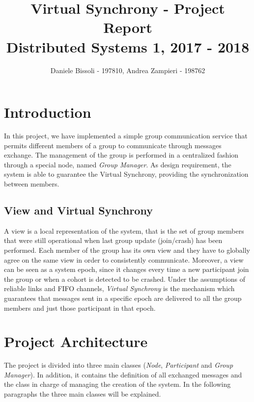 \documentclass[11pt]{article}
\title{\LARGE{\textbf{Virtual Synchrony - Project Report}\\[0mm]\large{Distributed Systems 1, 2017 - 2018}}}
\author{Daniele Bissoli - 197810, Andrea Zampieri - 198762}
\date{}
\begin{document}
	\maketitle
	
	\section{Introduction}
	In this project, we have implemented a simple group communication service that permits different members of a group to communicate through messages exchange. The management of the group is performed in a centralized fashion through a special node, named \textit{Group Manager}. As design requirement, the system is able to guarantee the Virtual Synchrony, providing the synchronization between members.
	
	\subsection{View and Virtual Synchrony}
	A view is a local representation of the system, that is the set of group members that were still operational when last group update (join/crash) has been performed. Each member of the group has its own view and they have to globally agree on the same view in order to consistently communicate. Moreover, a view can be seen as a system epoch, since it changes every time a new participant join the group or when a cohort is detected to be crashed.
	Under the assumptions of reliable links and FIFO channels, \textit{Virtual Synchrony} is the mechanism which guarantees that messages sent in a specific epoch are delivered to all the group members and just those participant in that epoch.
	
	\section{Project Architecture}
	The project is divided into three main classes (\textit{Node}, \textit{Participant} and \textit{Group Manager}). In addition, it contains the definition of all exchanged messages and the class in charge of managing the creation of the system. In the following paragraphs the three main classes will be explained.
	
\end{document}
